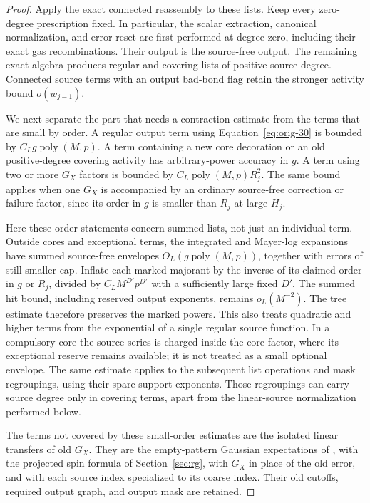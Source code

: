 \begin{proof}
Apply the exact connected reassembly  to these
lists.  Keep every zero-degree prescription fixed.  In particular,
the scalar extraction, canonical normalization, and error reset
are first performed at degree zero, including their exact gas
recombinations.  Their output is the source-free output.  The
remaining exact algebra produces regular and covering lists of
positive source degree.  Connected source terms with an output
bad-bond flag retain the stronger activity bound $o(w_{j-1})$.

We next separate the part that needs a contraction estimate from
the terms that are small by order.  A regular output term using
Equation~\eqref{eq:orig-30} is bounded by
$C_Lg\operatorname{poly}(M,p)$.  A term containing a new core
decoration or an old positive-degree covering activity has
arbitrary-power accuracy in $g$.  A term using two or more
$G_X$ factors is bounded by
$C_L\operatorname{poly}(M,p)R_j^2$.  The same bound applies when
one $G_X$ is accompanied by an ordinary source-free correction
or failure factor, since its order in $g$ is smaller than $R_j$
at large $H_j$.

Here these order statements concern summed lists, not just an
individual term.  Outside cores and exceptional terms, the
integrated and Mayer-log expansions have summed source-free
envelopes $O_L(g\operatorname{poly}(M,p))$, together with errors
of still smaller cap.  Inflate each marked majorant by the
inverse of its claimed order in $g$ or $R_j$, divided by
$C_LM^{D'}p^{D'}$ with a sufficiently large fixed $D'$.  The
summed hit bound, including reserved output exponents, remains
$o_L(M^{-2})$.  The tree estimate therefore preserves the marked
powers.  This also treats quadratic and higher terms from the
exponential of a single regular source function.  In a compulsory
core the source series is charged inside the core factor, where
its exceptional reserve remains available; it is not treated as
a small optional envelope.  The same estimate applies to the
subsequent list operations and mask regroupings, using their
spare support exponents.  Those regroupings can carry source
degree only in covering terms, apart from the linear-source
normalization performed below.

The terms not covered by these small-order estimates are the
isolated linear transfers of old $G_X$.  They are the empty-pattern
Gaussian expectations of , with the
projected spin formula of Section~\ref{sec:rg}, with $G_X$ in
place of the old error, and with each source index specialized
to its coarse index.  Their old cutoffs, required output graph,
and output mask are retained.


\end{proof}
